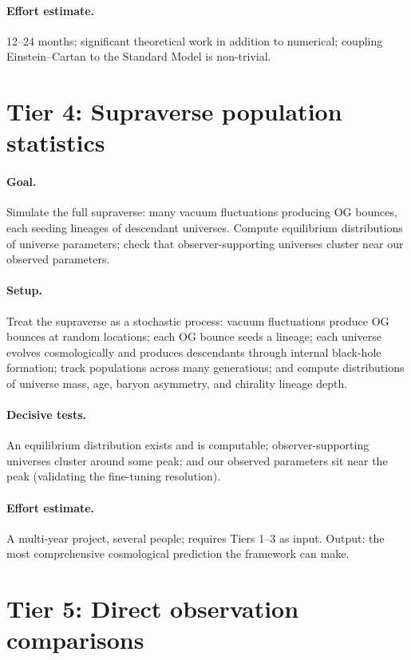 \paragraph{Effort estimate.} 12--24 months; significant theoretical work in
addition to numerical; coupling Einstein--Cartan to the Standard Model is
non-trivial.

\section{Tier 4: Supraverse population statistics}

\paragraph{Goal.} Simulate the full supraverse: many vacuum fluctuations
producing OG bounces, each seeding lineages of descendant universes. Compute
equilibrium distributions of universe parameters; check that observer-supporting
universes cluster near our observed parameters.

\paragraph{Setup.} Treat the supraverse as a stochastic process: vacuum
fluctuations produce OG bounces at random locations; each OG bounce seeds a
lineage; each universe evolves cosmologically and produces descendants through
internal black-hole formation; track populations across many generations; and
compute distributions of universe mass, age, baryon asymmetry, and chirality
lineage depth.

\paragraph{Decisive tests.} An equilibrium distribution exists and is computable;
observer-supporting universes cluster around some peak; and our observed
parameters sit near the peak (validating the fine-tuning resolution).

\paragraph{Effort estimate.} A multi-year project, several people; requires
Tiers 1--3 as input. Output: the most comprehensive cosmological prediction the
framework can make.

\section{Tier 5: Direct observation comparisons}

